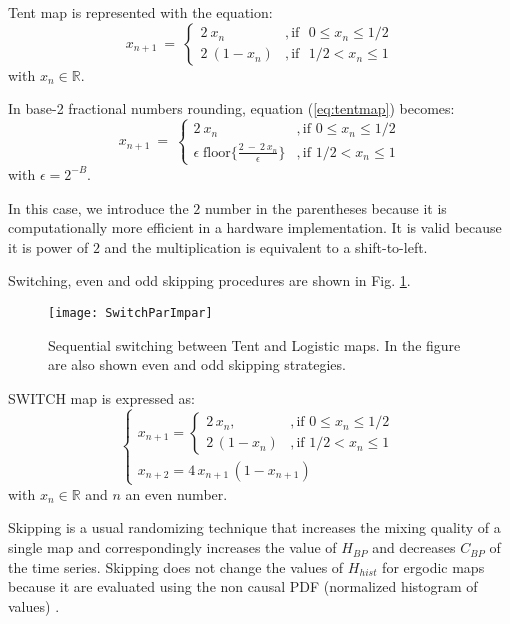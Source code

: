 Tent map is represented with the equation:
%
\begin{equation}\label{eq:tentmap}
x_{n+1}~=~ \left\{ \begin{array}{ll}
2~{x_n} &, \textrm{if ~$0\leq x_n\leq 1/2$}\\
2~(1-{x_n}) &, \textrm{if ~$1/2<x_n\leq 1$} 
\end{array} \right. 
\end{equation}
%
with $x_n \in \mathbb{R}$.

In base-2 fractional numbers rounding, equation (\ref{eq:tentmap}) becomes:
%
\begin{equation}\label{eq:tentdecbin}
x_{n+1}~=~ \left\{ \begin{array}{ll}
2~{x_n} &, \textrm{if $0\leq x_n\leq 1/2$}\\
\epsilon \; \text{floor}\{\frac{2~-~2~x_n}{\epsilon}\} &, \textrm{if $1/2<x_n\leq 1$} 
\end{array} \right. 
\end{equation}
%
with $\epsilon=2^{-B}$.

In this case, we introduce the $2$ number in the parentheses because it is computationally more efficient in a hardware implementation.
It is valid because it is power of $2$ and the multiplication is equivalent to a shift-to-left.

Switching, even and odd skipping procedures are shown in Fig. \ref{fig:seq}.
%
\begin{figure}[htpb]
\centering	
	\texttt{[image: SwitchParImpar]}
	\caption{Sequential switching between Tent and Logistic maps. In the figure are also shown even and odd skipping strategies.} \label{fig:seq}
\end{figure}

SWITCH map is expressed as:
%
\begin{equation}
\begin{cases}
x_{n+1}=
\begin{cases}
2\,x_n, &, \mbox{if } 0\leq x_n\leq 1/2 \\
2\,(1-x_n ) &, \mbox{if } 1/2<x_n\leq 1
\end{cases} \\
x_{n+2}=4\,x_{n+1}\,(1-x_{n+1})
\end{cases}\label{eq:SWITCH}
\end{equation}
%
with $x_n \in \mathbb{R}$ and $n$ an even number.

Skipping is a usual randomizing technique that increases the mixing quality of a single map and correspondingly increases the value of $H_{BP}$ and decreases $C_{BP} $ of the time series.
Skipping does not change the values of $H_{hist}$ for ergodic maps because it are evaluated using the non causal PDF (normalized histogram of values) \cite{DeMicco2008}.

